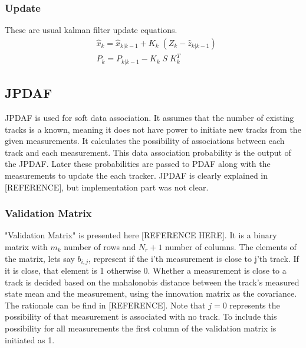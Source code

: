 \documentclass[peerreview]{IEEEtran}
\begin{document}
\vspace{10px}

\subsubsection{Update}
These are usual kalman filter update equations.
\begin{equation}
\begin{aligned}
&\hat{x}_k = \hat{x}_{k|k-1} + K_k \; (Z_k - \hat{z}_{k|k-1}) \\
&P_k = P_{k|k-1} - K_k \; S \; K_k^T
\end{aligned}
\end{equation}

\vspace{10px}

\subsection{JPDAF}
 JPDAF is used for soft data association. It assumes that the number of existing tracks is a known, meaning it does not have power to initiate new tracks from the given measurements. It calculates the possibility of associations between each track and each measurement. This data association probability is the output of the JPDAF. Later these probabilities are passed to PDAF along with the measurements to update the each tracker. JPDAF is clearly explained in [REFERENCE], but implementation part was not clear.

\vspace{10px}

\subsubsection{Validation Matrix}
"Validation Matrix" is presented here [REFERENCE HERE]. It is a binary matrix with $m_k$ number of rows and $N_r+1$ number of columns. The elements of the matrix, lets say $b_{i,j}$, represent if the i'th measurement is close to j'th track. If it is close, that element is 1 otherwise 0. Whether a measurement is close to a track is decided based on the mahalonobis distance between the track's measured state mean and the measurement, using the innovation matrix as the covariance. The rationale can be find in [REFERENCE]. Note that $j=0$ represents the possibility of that measurement is associated with no track. To include this possibility for all measurements the first column of the validation matrix is initiated as 1.
\end{document}
